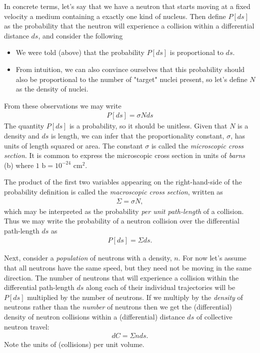 \documentclass[11pt]{article}
\begin{document}
In concrete terms, let's say that we have a  neutron that starts moving at a fixed velocity a medium  containing a exactly one kind of nucleus.  Then define \(P[ds]\) as the probability that the neutron will experience a collision within a differential distance \(ds\), and consider the following
\begin{itemize}
\item We were told (above) that the probability \(P[ds]\) is proportional to \(ds\).
\item From intuition, we can also convince ourselves that this probability should also be proportional to the number of "target" nuclei present, so let's define \(N\) as the density of nuclei.
\end{itemize}
From these observations we may write
\begin{align}
  P[ds] = \sigma N ds
\end{align}
The quantity \(P[ds]\) is a probability, so it should be unitless.  Given that \(N\) is a density and \(ds\) is length, we can infer that the proportionality constant, \(\sigma\), has units of length squared or area.  The constant \(\sigma\) is called the \emph{microscopic cross section}.  It is common to express the microscopic cross section in units of \emph{barns} (b) where \(1 \text{ b} = 10^{-24} \text{ cm}^2\).

The product of the first two variables appearing on the right-hand-side of the probability definition is called the \emph{macroscopic cross section}, written as
\begin{align}
  \Sigma = \sigma N,
\end{align}
which may be interpreted as the probability \emph{per unit path-length} of a collision.  Thus we may write the probability of a neutron collision over the differential path-length \(ds\) as
\begin{align}
  P[ds] = \Sigma ds.
\end{align}

Next, consider a \emph{population} of neutrons with a density, \(n\).  For now let's assume that all neutrons have the same speed, but they need not be moving in the same direction.  The number of neutrons that will experience a collision within the differential path-length \(ds\) along each of their individual trajectories will be \(P[ds]\) multiplied by the number of neutrons.  If we multiply by the \emph{density} of neutrons rather than the \emph{number} of neutrons then we get the (differential) density of neutron collisions within a (differential) distance \(ds\) of collective neutron travel:
\begin{align}
  dC = \Sigma n ds.
\end{align}
Note the units of (collisions) per unit volume.
\end{document}
